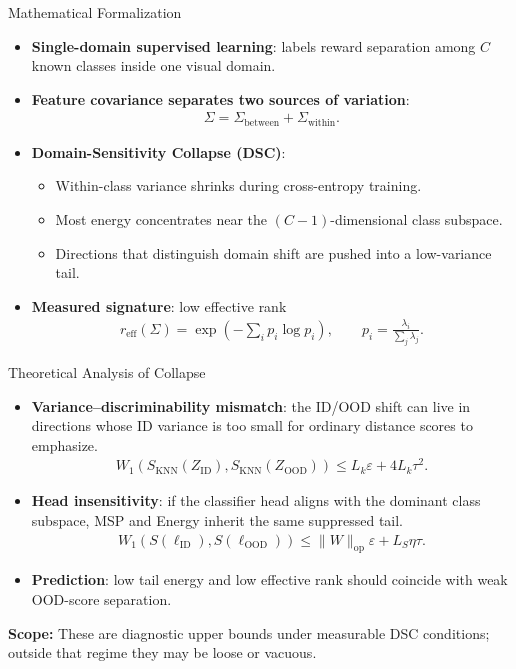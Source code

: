 \documentclass[aspectratio=1610]{beamer}
\newcommand{\scopefooter}[1]{%
  \vfill
  \begin{center}
    \footnotesize\textbf{Scope:} #1
  \end{center}%
}
\begin{document}
\begin{frame}{Mathematical Formalization}
\begin{itemize}
  \item \textbf{Single-domain supervised learning}: labels reward separation among $C$ known classes inside one visual domain.
  \item \textbf{Feature covariance separates two sources of variation}:
  \begin{align*}
    \Sigma=\Sigma_{\mathrm{between}}+\Sigma_{\mathrm{within}}.
  \end{align*}
  \item \textbf{Domain-Sensitivity Collapse (DSC)}:
  \begin{itemize}
    \item Within-class variance shrinks during cross-entropy training.
    \item Most energy concentrates near the $(C-1)$-dimensional class subspace.
    \item Directions that distinguish domain shift are pushed into a low-variance tail.
  \end{itemize}
  \item \textbf{Measured signature}: low effective rank
  \begin{align*}
    r_{\mathrm{eff}}(\Sigma)=\exp\!\left(-\sum_i p_i\log p_i\right),
    \qquad p_i=\frac{\lambda_i}{\sum_j\lambda_j}.
  \end{align*}
\end{itemize}
\end{frame}

\begin{frame}{Theoretical Analysis of Collapse}
\small
\begin{itemize}
  \item \textbf{Variance--discriminability mismatch}: the ID/OOD shift can live in directions whose ID variance is too small for ordinary distance scores to emphasize.
  \begin{align*}
    W_1\!\left(S_{\mathrm{KNN}}(Z_{\mathrm{ID}}),S_{\mathrm{KNN}}(Z_{\mathrm{OOD}})\right)
    \le L_k\varepsilon+4L_k\tau^2.
  \end{align*}
  \item \textbf{Head insensitivity}: if the classifier head aligns with the dominant class subspace, MSP and Energy inherit the same suppressed tail.
  \begin{align*}
    W_1\!\left(S(\ell_{\mathrm{ID}}),S(\ell_{\mathrm{OOD}})\right)
    \le \lVert W\rVert_{\mathrm{op}}\varepsilon+L_S\eta\tau.
  \end{align*}
  \item \textbf{Prediction}: low tail energy and low effective rank should coincide with weak OOD-score separation.
\end{itemize}
\scopefooter{These are diagnostic upper bounds under measurable DSC conditions; outside that regime they may be loose or vacuous.}
\end{frame}
\end{document}
